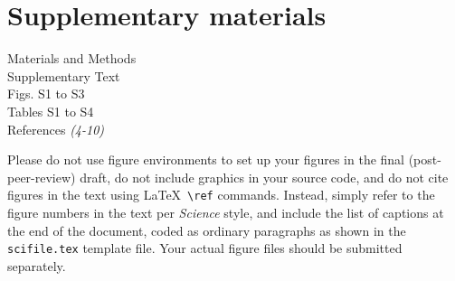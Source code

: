 \documentclass[12pt]{article}
\begin{document}
\section*{Supplementary materials}
Materials and Methods\\
Supplementary Text\\
Figs. S1 to S3\\
Tables S1 to S4\\
References \textit{(4-10)}




\clearpage

 Please do not use figure environments to set
up your figures in the final (post-peer-review) draft, do not include graphics in your
source code, and do not cite figures in the text using \LaTeX\
\verb+\ref+ commands.  Instead, simply refer to the figure numbers in
the text per {\it Science\/} style, and include the list of captions at
the end of the document, coded as ordinary paragraphs as shown in the
\texttt{scifile.tex} template file.  Your actual figure files should
be submitted separately.
\end{document}
